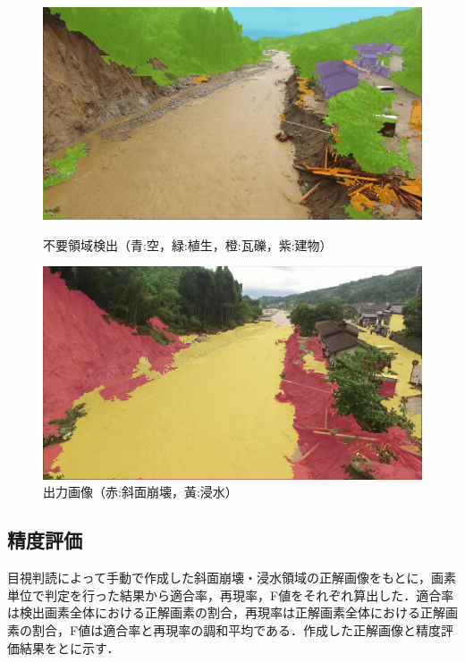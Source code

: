\documentclass[a4paper, twocolumn, xelatex, 8pt, ja=standard, Ligatures=TeX]{bxjsarticle}
\begin{document}
	\begin{figure}[t]
		\begin{minipage}{0.48\hsize}
			\centering
			\includegraphics[width=\linewidth]{img/rejection.png}
			\caption{不要領域検出（青:空，緑:植生，橙:瓦礫，紫:建物）}
			\label{img06}
		\end{minipage}
		\begin{minipage}{0.48\hsize}
			\centering
			\includegraphics[width=\linewidth]{img/result.png}
			\caption{出力画像（赤:斜面崩壊，黃:浸水）}
			\label{img07}
		\end{minipage}
	\end{figure}

\subsection{精度評価}
	目視判読によって手動で作成した斜面崩壊・浸水領域の正解画像をもとに，画素単位で判定を行った結果から適合率，再現率，F値をそれぞれ算出した．適合率は検出画素全体における正解画素の割合，再現率は正解画素全体における正解画素の割合，F値は適合率と再現率の調和平均である．作成した正解画像と精度評価結果をとに示す．
\end{document}
